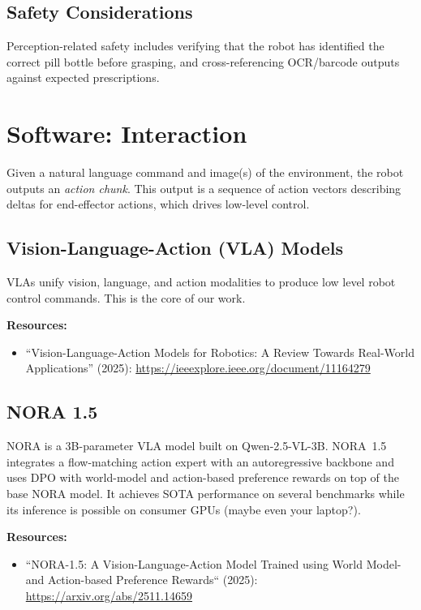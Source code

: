 \documentclass[11pt]{article}
\begin{document}
\subsection{Safety Considerations}
Perception-related safety includes verifying that the robot has identified the correct pill bottle before grasping, and cross-referencing OCR/barcode outputs against expected prescriptions.

\section{Software: Interaction}
\label{sec:interaction}

Given a natural language command and image(s) of the environment, the robot outputs an \emph{action chunk}. This output is a sequence of action vectors describing deltas for end-effector actions, which drives low-level control.

\subsection{Vision-Language-Action (VLA) Models}
VLAs unify vision, language, and action modalities to produce low level robot control commands. This is the core of our work.

\textbf{Resources:}
\begin{itemize}[nosep]
    \item ``Vision-Language-Action Models for Robotics: A Review Towards Real-World Applications'' (2025): \url{https://ieeexplore.ieee.org/document/11164279}
\end{itemize}

\subsection{NORA 1.5}
NORA is a 3B-parameter VLA model built on Qwen-2.5-VL-3B. NORA~1.5 integrates a flow-matching action expert with an autoregressive backbone and uses DPO with world-model and action-based preference rewards on top of the base NORA model. It achieves SOTA performance on several benchmarks while its inference is possible on consumer GPUs (maybe even your laptop?).

\textbf{Resources:}
\begin{itemize}[nosep]
    \item ``NORA-1.5: A Vision-Language-Action Model Trained using World Model- and Action-based Preference Rewards`` (2025): \url{https://arxiv.org/abs/2511.14659}
\end{itemize}
\end{document}
